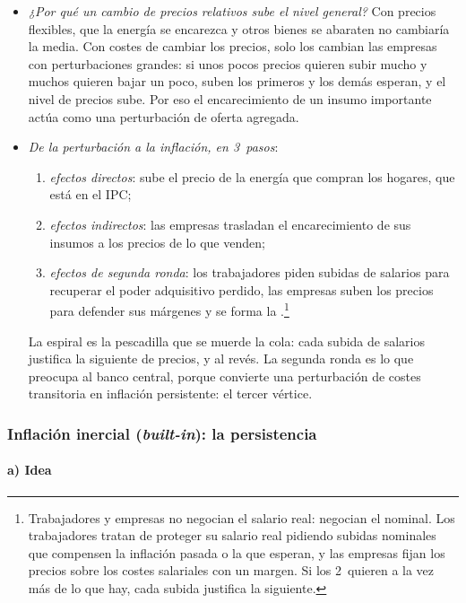 \documentclass[11pt]{article}
\begin{document}
\begin{itemize}
\item \emph{¿Por qué un cambio de precios relativos sube el nivel general?} Con precios flexibles, que la energía se encarezca y otros bienes se abaraten no cambiaría la media. Con costes de cambiar los precios, solo los cambian las empresas con perturbaciones grandes: si unos pocos precios quieren subir mucho y muchos quieren bajar un poco, suben los primeros y los demás esperan, y el nivel de precios sube\nocite{BallMankiw1995Relative}. Por eso el encarecimiento de un insumo importante actúa como una perturbación de oferta agregada.
\item \emph{De la perturbación a la inflación, en 3~pasos}\nocite{BdE2022InformeAnual2021}:
  \begin{enumerate}
  \item \emph{efectos directos}: sube el precio de la energía que compran los hogares, que está en el IPC;
  \item \emph{efectos indirectos}: las empresas trasladan el encarecimiento de sus insumos a los precios de lo que venden;
  \item \emph{efectos de segunda ronda}: los trabajadores piden subidas de salarios para recuperar el poder adquisitivo perdido, las empresas suben los precios para defender sus márgenes y se forma la .\footnote{Trabajadores y empresas no negocian el salario real: negocian el nominal. Los trabajadores tratan de proteger su salario real pidiendo subidas nominales que compensen la inflación pasada o la que esperan, y las empresas fijan los precios sobre los costes salariales con un margen. Si los 2~quieren a la vez más de lo que hay, cada subida justifica la siguiente.}
  \end{enumerate}
  La espiral es la pescadilla que se muerde la cola: cada subida de salarios justifica la siguiente de precios, y al revés. La segunda ronda es lo que preocupa al banco central, porque convierte una perturbación de costes transitoria en inflación persistente: el tercer vértice.
\end{itemize}

\subsubsection{Inflación inercial (\emph{built-in}): la persistencia}\label{sec:inercia}

\paragraph{a) Idea}
\end{document}
